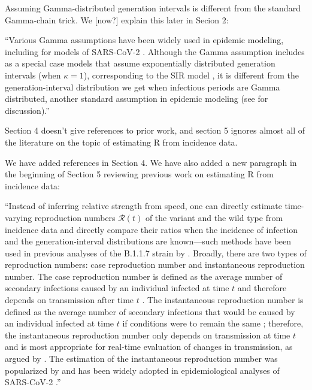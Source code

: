 \documentclass[12pt]{article}
\newcommand{\RR}{\ensuremath{{\mathcal R}}\xspace}
\newcommand{\revtext}{\textsf}
\begin{document}
Assuming Gamma-distributed generation intervals is different from the standard Gamma-chain trick. We [now?] explain this later in Secion 2:

``Various Gamma assumptions have been widely used in epidemic modeling, including for models of SARS-CoV-2 \citep{doi:10.1098/rsif.2020.0144}.
Although the Gamma assumption includes as a special case models that assume exponentially distributed generation intervals (when $\kappa=1$), corresponding to the SIR model \citep{anderson1991infectious}, it is different from the generation-interval distribution we get when infectious periods are Gamma distributed, another standard assumption in epidemic modeling (see \cite{roberts2007model} for discussion).''

\revtext{Section 4 doesn't give references to prior work, and section 5 ignores almost all of the literature on the topic of estimating R from incidence data.}

We have added references in Section 4.
We have also added a new paragraph in the beginning of Section 5 reviewing previous work on estimating R from incidence data:

``Instead of inferring relative strength from speed, one can directly estimate time-varying reproduction numbers $\RR(t)$ of the variant and the wild type from incidence data and directly compare their ratios when the incidence of infection and the generation-interval distributions are known---such methods have been used in previous analyses of the B.1.1.7 strain by \cite{volz2021transmission}.
Broadly, there are two types of reproduction numbers: case reproduction number and instantaneous reproduction number.
The case reproduction number is defined as the average number of secondary infections caused by an individual infected at time $t$ and therefore depends on transmission after time $t$ \citep{wallinga2004different}.
The instantaneous reproduction number is defined as the average number of secondary infections that would be caused by an individual infected at time $t$ if conditions were to remain the same \citep{fraser2007estimating}; 
therefore, the instantaneous reproduction number only depends on transmission at time $t$ and is most appropriate for real-time evaluation of changes in transmission, as argued by \citep{gostic2020practical}.
The estimation of the instantaneous reproduction number was popularized by \cite{cori2013new} and has been widely adopted in epidemiological analyses of SARS-CoV-2 \citep{abbott2020estimating,knight2020estimating,flaxman2020Rt,brauner2021inferring,li2021temporal}.''
\end{document}
